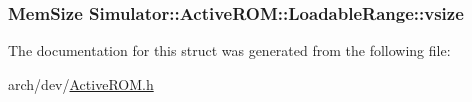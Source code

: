 \hypertarget{struct_simulator_1_1_active_r_o_m_1_1_loadable_range_a7ca4c84b142a8d57aa61fad3fac3f5e4}{
\subsubsection[{vsize}]{\setlength{\rightskip}{0pt plus 5cm}Mem\+Size Simulator\+::\+Active\+R\+O\+M\+::\+Loadable\+Range\+::vsize}}\label{struct_simulator_1_1_active_r_o_m_1_1_loadable_range_a7ca4c84b142a8d57aa61fad3fac3f5e4}


The documentation for this struct was generated from the following file\+:\begin{DoxyCompactItemize}
\item 
arch/dev/\hyperlink{_active_r_o_m_8h}{Active\+R\+O\+M.\+h}\end{DoxyCompactItemize}
